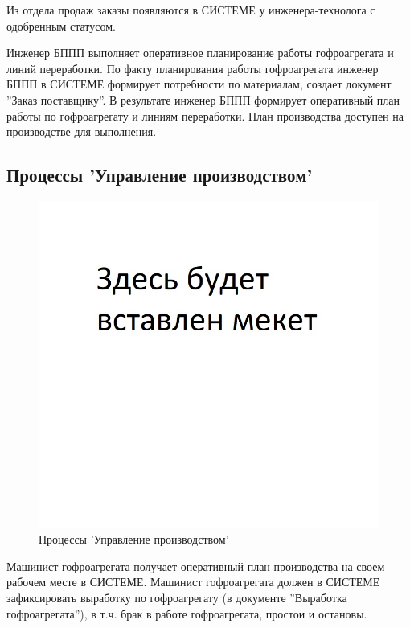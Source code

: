 Из отдела продаж заказы появляются в СИСТЕМЕ у инженера-технолога с одобренным статусом.

Инженер БППП выполняет оперативное планирование работы гофроагрегата и линий переработки. По факту планирования работы гофроагрегата инженер БППП  в СИСТЕМЕ формирует потребности по материалам, создает документ ''Заказ поставщику''. 
В результате инженер БППП формирует оперативный план работы по гофроагрегату и линиям переработки.
План производства доступен на производстве для выполнения.



\subsection{Процессы 'Управление производством'}
%
\begin{figure}
\begin{center}
  \includegraphics[angle=90, height=0.9\textheight, keepaspectratio]{Pics/Pattern.jpg}
\end{center}
  \caption{Процессы 'Управление производством'}
  \label{pic:Schema_4}
\end{figure}




 Машинист гофроагрегата получает оперативный план производства на своем рабочем месте в СИСТЕМЕ. Машинист гофроагрегата должен в СИСТЕМЕ зафиксировать выработку по гофроагрегату (в документе ''Выработка гофроагрегата''), в т.ч. брак в работе гофроагрегата, простои и остановы.

